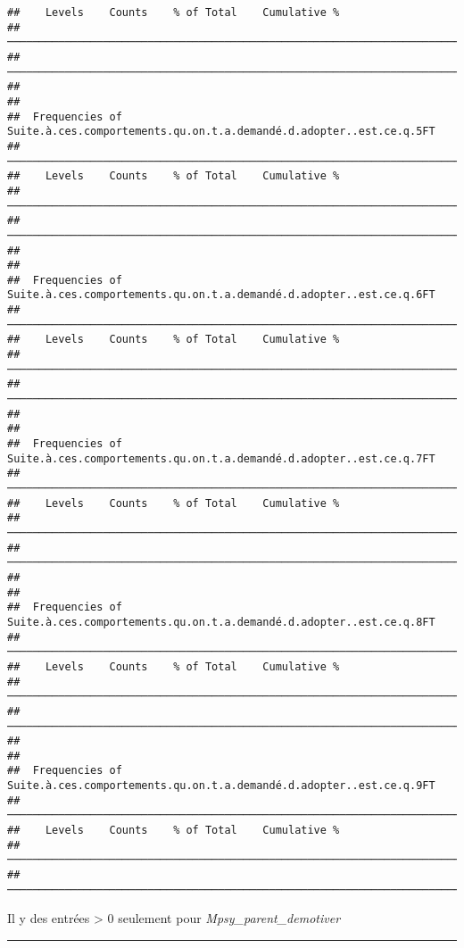 \documentclass[
]{article}
\begin{document}
\begin{verbatim}
##    Levels    Counts    % of Total    Cumulative %   
##  ────────────────────────────────────────────────────────────────────────────────── 
##  ────────────────────────────────────────────────────────────────────────────────── 
## 
## 
##  Frequencies of Suite.à.ces.comportements.qu.on.t.a.demandé.d.adopter..est.ce.q.5FT 
##  ────────────────────────────────────────────────────────────────────────────────── 
##    Levels    Counts    % of Total    Cumulative %   
##  ────────────────────────────────────────────────────────────────────────────────── 
##  ────────────────────────────────────────────────────────────────────────────────── 
## 
## 
##  Frequencies of Suite.à.ces.comportements.qu.on.t.a.demandé.d.adopter..est.ce.q.6FT 
##  ────────────────────────────────────────────────────────────────────────────────── 
##    Levels    Counts    % of Total    Cumulative %   
##  ────────────────────────────────────────────────────────────────────────────────── 
##  ────────────────────────────────────────────────────────────────────────────────── 
## 
## 
##  Frequencies of Suite.à.ces.comportements.qu.on.t.a.demandé.d.adopter..est.ce.q.7FT 
##  ────────────────────────────────────────────────────────────────────────────────── 
##    Levels    Counts    % of Total    Cumulative %   
##  ────────────────────────────────────────────────────────────────────────────────── 
##  ────────────────────────────────────────────────────────────────────────────────── 
## 
## 
##  Frequencies of Suite.à.ces.comportements.qu.on.t.a.demandé.d.adopter..est.ce.q.8FT 
##  ────────────────────────────────────────────────────────────────────────────────── 
##    Levels    Counts    % of Total    Cumulative %   
##  ────────────────────────────────────────────────────────────────────────────────── 
##  ────────────────────────────────────────────────────────────────────────────────── 
## 
## 
##  Frequencies of Suite.à.ces.comportements.qu.on.t.a.demandé.d.adopter..est.ce.q.9FT 
##  ────────────────────────────────────────────────────────────────────────────────── 
##    Levels    Counts    % of Total    Cumulative %   
##  ────────────────────────────────────────────────────────────────────────────────── 
##  ──────────────────────────────────────────────────────────────────────────────────
\end{verbatim}

Il y des entrées \textgreater{} 0 seulement pour
\emph{Mpsy\_parent\_demotiver}

\begin{center}\rule{0.5\linewidth}{0.5pt}\end{center}
\end{document}
